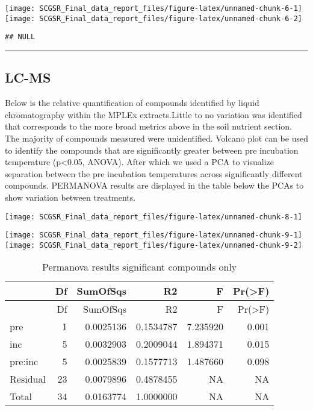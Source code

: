 \documentclass[
]{article}
\begin{document}
\texttt{[image: SCGSR\_Final\_data\_report\_files/figure-latex/unnamed-chunk-6-1]}
\texttt{[image: SCGSR\_Final\_data\_report\_files/figure-latex/unnamed-chunk-6-2]}

\begin{verbatim}
## NULL
\end{verbatim}

\begin{center}\rule{0.5\linewidth}{0.5pt}\end{center}

\hypertarget{lc-ms}{%
\subsection{LC-MS}\label{lc-ms}}

Below is the relative quantification of compounds identified by liquid
chromatography within the MPLEx extracts.Little to no variation was
identified that corresponds to the more broad metrics above in the soil
nutrient section. The majority of compounds measured were unidentified.
Volcano plot can be used to identify the compounds that are
significantly greater between pre incubation temperature
(p\textless0.05, ANOVA). After which we used a PCA to visualize
separation between the pre incubation temperatures across significantly
different compounds. PERMANOVA results are displayed in the table below
the PCAs to show variation between treatments.

\texttt{[image: SCGSR\_Final\_data\_report\_files/figure-latex/unnamed-chunk-8-1]}

\texttt{[image: SCGSR\_Final\_data\_report\_files/figure-latex/unnamed-chunk-9-1]}
\texttt{[image: SCGSR\_Final\_data\_report\_files/figure-latex/unnamed-chunk-9-2]}

\begin{longtable}[]{@{}lrrrrr@{}}
\caption{Permanova results significant compounds only}\tabularnewline
\toprule\noalign{}
& Df & SumOfSqs & R2 & F & Pr(\textgreater F) \\
\midrule\noalign{}
\endfirsthead
\toprule\noalign{}
& Df & SumOfSqs & R2 & F & Pr(\textgreater F) \\
\midrule\noalign{}
\endhead
\bottomrule\noalign{}
\endlastfoot
pre & 1 & 0.0025136 & 0.1534787 & 7.235920 & 0.001 \\
inc & 5 & 0.0032903 & 0.2009044 & 1.894371 & 0.015 \\
pre:inc & 5 & 0.0025839 & 0.1577713 & 1.487660 & 0.098 \\
Residual & 23 & 0.0079896 & 0.4878455 & NA & NA \\
Total & 34 & 0.0163774 & 1.0000000 & NA & NA \\
\end{longtable}
\end{document}
